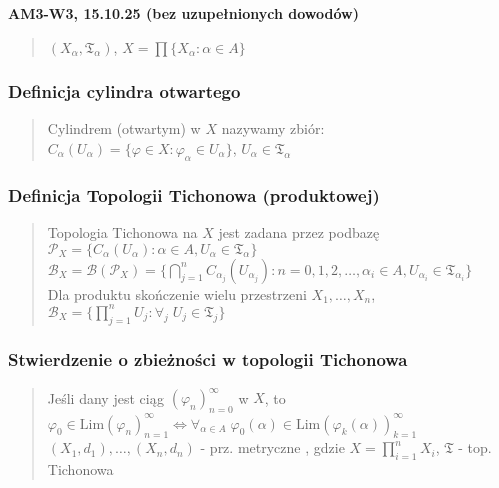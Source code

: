 \documentclass[10pt,a4paper]{article}
\newcommand{\zagadnienie}[3]{%
    \clearpage %
    \noindent\textbf{#1} #2\\
    #3
}
\begin{document}
\zagadnienie{AM3-W3, 15.10.25 (bez uzupełnionych dowodów)}{}
{

    \begin{quote}
    $(X_\alpha, \mathfrak{T}_\alpha)$, $X = \prod \{X_\alpha : \alpha \in A\}$ \\
    \end{quote}

    \subsubsection*{Definicja cylindra otwartego}
    \begin{quote}
    Cylindrem (otwartym) w $X$ nazywamy zbiór: \\
    $C_\alpha(U_\alpha) = \{\varphi \in X : \varphi_\alpha \in U_\alpha\}$, $U_\alpha \in \mathfrak{T}_\alpha$
    \end{quote}

    \subsubsection*{Definicja Topologii Tichonowa (produktowej)}
    \begin{quote}
    Topologia Tichonowa na $X$ jest zadana przez podbazę \\
    $\mathcal{P}_X = \{C_\alpha(U_\alpha) : \alpha \in A, U_\alpha \in \mathfrak{T}_\alpha\}$ \\
    $\mathcal{B}_X = \mathcal{B}(\mathcal{P}_X) = \{\bigcap_{j=1}^n C_{\alpha_j}(U_{\alpha_j}) : n=0,1,2,\dots, \alpha_i \in A, U_{\alpha_i} \in \mathfrak{T}_{\alpha_i}\}$ \\
    Dla produktu skończenie wielu przestrzeni $X_1, \dots, X_n$, \\
    $\mathcal{B}_X = \{\prod_{j=1}^n U_j : \forall_j \; U_j \in \mathfrak{T}_j\}$
    \end{quote}
    }

    \subsubsection*{Stwierdzenie o zbieżności w topologii Tichonowa}
    \begin{quote}
    Jeśli dany jest ciąg $(\varphi_n)_{n=0}^\infty$ w $X$, to $\varphi_0 \in \mathrm{Lim} (\varphi_n)_{n=1}^\infty \iff \forall_{\alpha \in A} \; \varphi_0(\alpha) \in \mathrm{Lim} (\varphi_k(\alpha))_{k=1}^\infty$ \\
    $(X_1, d_1), \dots, (X_n, d_n)$ - prz. metryczne , gdzie $X = \prod_{i=1}^n X_i$, $\mathfrak{T}$ - top. Tichonowa
    \end{quote}
\end{document}
